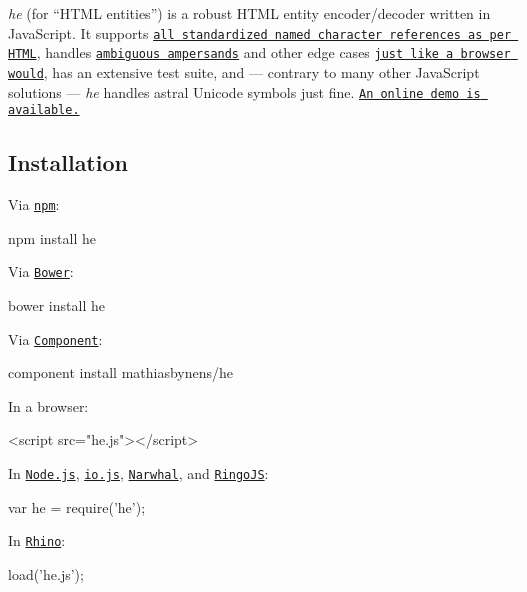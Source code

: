 {\itshape he} (for “\+H\+T\+ML entities”) is a robust H\+T\+ML entity encoder/decoder written in Java\+Script. It supports \href{https://html.spec.whatwg.org/multipage/syntax.html#named-character-references}{\tt all standardized named character references as per H\+T\+ML}, handles \href{https://mathiasbynens.be/notes/ambiguous-ampersands}{\tt ambiguous ampersands} and other edge cases \href{https://html.spec.whatwg.org/multipage/syntax.html#tokenizing-character-references}{\tt just like a browser would}, has an extensive test suite, and — contrary to many other Java\+Script solutions — {\itshape he} handles astral Unicode symbols just fine. \href{https://mothereff.in/html-entities}{\tt An online demo is available.}

\subsection*{Installation}

Via \href{https://www.npmjs.com/}{\tt npm}\+:


\begin{DoxyCode}
npm install he
\end{DoxyCode}


Via \href{http://bower.io/}{\tt Bower}\+:


\begin{DoxyCode}
bower install he
\end{DoxyCode}


Via \href{https://github.com/component/component}{\tt Component}\+:


\begin{DoxyCode}
component install mathiasbynens/he
\end{DoxyCode}


In a browser\+:


\begin{DoxyCode}
<script src="he.js"></script>
\end{DoxyCode}


In \href{https://nodejs.org/}{\tt Node.\+js}, \href{https://iojs.org/}{\tt io.\+js}, \href{http://narwhaljs.org/}{\tt Narwhal}, and \href{http://ringojs.org/}{\tt Ringo\+JS}\+:


\begin{DoxyCode}
var he = require('he');
\end{DoxyCode}


In \href{http://www.mozilla.org/rhino/}{\tt Rhino}\+:


\begin{DoxyCode}
load('he.js');
\end{DoxyCode}


